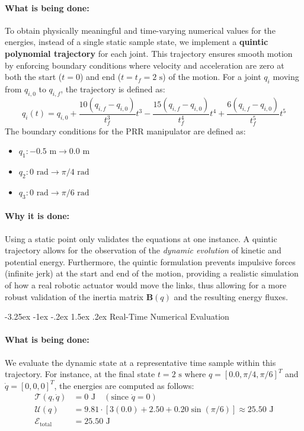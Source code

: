 \documentclass[11pt, a4paper]{article}
\makeatletter
\renewcommand{\subsection}{\@startsection{subsection}{2}{\z@}%
    {-3.25ex \@plus -1ex \@minus -.2ex}%
    {1.5ex \@plus .2ex}%
    {\normalfont\large\bfseries\color{brandaccent}}}
\makeatother
\begin{document}
\paragraph{What is being done:}
To obtain physically meaningful and time-varying numerical values for the energies, instead of a single static sample state, we implement a \textbf{quintic polynomial trajectory} for each joint. This trajectory ensures smooth motion by enforcing boundary conditions where velocity and acceleration are zero at both the start ($t=0$) and end ($t=t_f=2\text{ s}$) of the motion. For a joint $q_i$ moving from $q_{i,0}$ to $q_{i,f}$, the trajectory is defined as:
\begin{equation}
    q_i(t) = q_{i,0} + \frac{10(q_{i,f}-q_{i,0})}{t_f^3}t^3 - \frac{15(q_{i,f}-q_{i,0})}{t_f^4}t^4 + \frac{6(q_{i,f}-q_{i,0})}{t_f^5}t^5
\end{equation}
The boundary conditions for the PRR manipulator are defined as:
\begin{itemize}[leftmargin=1.5em]
    \item $q_1: -0.5\text{ m} \to 0.0\text{ m}$
    \item $q_2: 0\text{ rad} \to \pi/4\text{ rad}$
    \item $q_3: 0\text{ rad} \to \pi/6\text{ rad}$
\end{itemize}

\paragraph{Why it is done:}
Using a static point only validates the equations at one instance. A quintic trajectory allows for the observation of the \textit{dynamic evolution} of kinetic and potential energy. Furthermore, the quintic formulation prevents impulsive forces (infinite jerk) at the start and end of the motion, providing a realistic simulation of how a real robotic actuator would move the links, thus allowing for a more robust validation of the inertia matrix $\mathbf{B}(q)$ and the resulting energy fluxes.

\subsection{Real-Time Numerical Evaluation}
\paragraph{What is being done:}
We evaluate the dynamic state at a representative time sample within this trajectory. For instance, at the final state $t=2\text{ s}$ where $q = [0.0, \pi/4, \pi/6]^T$ and $\dot{q} = [0, 0, 0]^T$, the energies are computed as follows:
\begin{align}
    \mathcal{T}(q, \dot{q}) &= 0\text{ J} \quad (\text{since } \dot{q} = 0) \\
    \mathcal{U}(q) &= 9.81 \cdot [ 3(0.0) + 2.50 + 0.20 \sin(\pi/6) ] \approx 25.50\text{ J} \\
    \mathcal{E}_{\text{total}} &= 25.50\text{ J}
\end{align}
\end{document}

